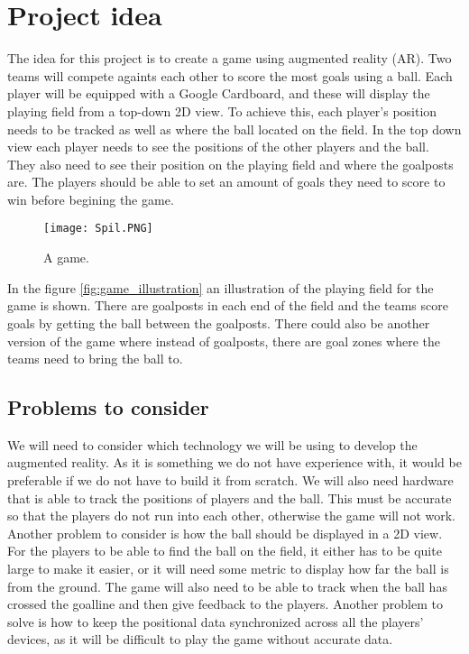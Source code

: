 \section{Project idea}
The idea for this project is to create a game using augmented reality (AR). 
Two teams will compete againts each other to score the most goals using a ball. 
Each player will be equipped with a Google Cardboard, and these will display the playing field from a top-down 2D view. 
To achieve this, each player's position needs to be tracked as well as where the ball located on the field.
In the top down view each player needs to see the positions of the other players and the ball.
They also need to see their position on the playing field and where the goalposts are.
The players should be able to set an amount of goals they need to score to win before begining the game. 
\begin{figure}[H]
    \centering
    \texttt{[image: Spil.PNG]}
    \caption{A game.}
    \label{fig:game_illustration}
\end{figure}
In the figure \autoref{fig:game_illustration} an illustration of the playing field for the game is shown. There are goalposts in each end of the field and the teams score goals by getting the ball between the goalposts. There could also be another version of the game where instead of goalposts, there are goal zones where the teams need to bring the ball to.
\subsection{Problems to consider}
We will need to consider which technology we will be using to develop the augmented reality. 
As it is something we do not have experience with, it would be preferable if we do not have to build it from scratch.
We will also need hardware that is able to track the positions of players and the ball.
This must be accurate so that the players do not run into each other, otherwise the game will not work.
Another problem to consider is how the ball should be displayed in a 2D view.
For the players to be able to find the ball on the field, it either has to be quite large to make it easier, or it will need some metric to display how far the ball is from the ground.
The game will also need to be able to track when the ball has crossed the goalline and then give feedback to the players.
Another problem to solve is how to keep the positional data synchronized across all the players' devices, as it will be difficult to play the game without accurate data.
